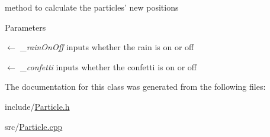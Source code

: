 method to calculate the particles' new positions 
\begin{DoxyParams}{Parameters}
\item[\mbox{$\leftarrow$} {\em \_\-rainOnOff}]inputs whether the rain is on or off \item[\mbox{$\leftarrow$} {\em \_\-confetti}]inputs whether the confetti is on or off \end{DoxyParams}


The documentation for this class was generated from the following files:\begin{DoxyCompactItemize}
\item 
include/\hyperlink{Particle_8h}{Particle.h}\item 
src/\hyperlink{Particle_8cpp}{Particle.cpp}\end{DoxyCompactItemize}
